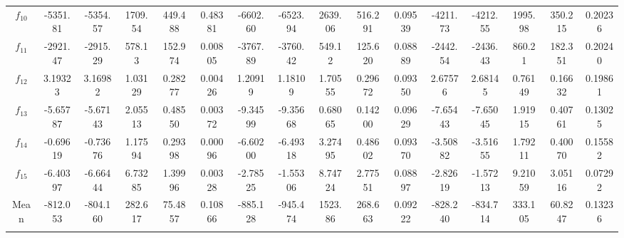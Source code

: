 \documentclass[paper=a4, fontsize=11pt]{scrartcl} %
\numberwithin{equation}{section} %
\numberwithin{figure}{section} %
\numberwithin{table}{section} %
\begin{document}
\begin{landscape}
\begin{table}
\begin{tabular}{c|ccccc|ccccc|ccccc}
				$f_{10}$ & -5351.81 & -5354.57 & 1709.54 & 449.488 & 0.48381 & -6602.60 & -6523.94 & 2639.06 & 516.291 & 0.09539 & -4211.73 & -4212.55 & 1995.98 & 350.215 & 0.20236\\
				$f_{11}$ & -2921.47 & -2915.29 & 578.13  & 152.974 & 0.00805 & -3767.89 & -3760.42 & 549.12  & 125.620 & 0.08889 & -2442.54 & -2436.43 & 860.21  & 182.351 & 0.20240\\
				$f_{12}$ &  3.19323 &  3.16982 & 1.03129 & 0.28277 & 0.00426 &  1.20919 &  1.18109 & 1.70555 & 0.29672 & 0.09350 &  2.67576 &  2.68145 & 0.76149 & 0.16632 & 0.19861\\
				$f_{13}$ & -5.65787 & -5.67143 & 2.05513 & 0.48550 & 0.00372 & -9.34599 & -9.35668 & 0.68065 & 0.14200 & 0.09629 & -7.65443 & -7.65045 & 1.91915 & 0.40761 & 0.13025\\
				$f_{14}$ & -0.69619 & -0.73676 & 1.17594 & 0.29398 & 0.00096 & -6.60200 & -6.49318 & 3.27495 & 0.48602 & 0.09370 & -3.50882 & -3.51655 & 1.79211 & 0.40070 & 0.15582\\
				$f_{15}$ & -6.40397 & -6.66444 & 6.73285 & 1.39996 & 0.00328 & -2.78525 & -1.55306 & 8.74724 & 2.77551 & 0.08897 & -2.82619 & -1.57213 & 9.21059 & 3.05116 & 0.07292\\
				
	\noalign{\smallskip}\hline\noalign{\smallskip}
				Mean & -812.053 & -804.160 & 282.617 & 75.4857 & 0.10866 & -885.128 & -945.474 & 1523.86 & 268.663 & 0.09222 & -828.240 & -834.714 & 333.105 & 60.8247 & 0.13236\\
	\noalign{\smallskip}\hline\noalign{\smallskip}
	\multicolumn{16}{l}{\tiny $^1$ 3.2GHz AMD Ryzen 7 1700X, 16 GB RAM}
		\end{tabular}\label{DE1_10}
	\end{table}
\end{landscape}

\pagebreak
\end{document}

